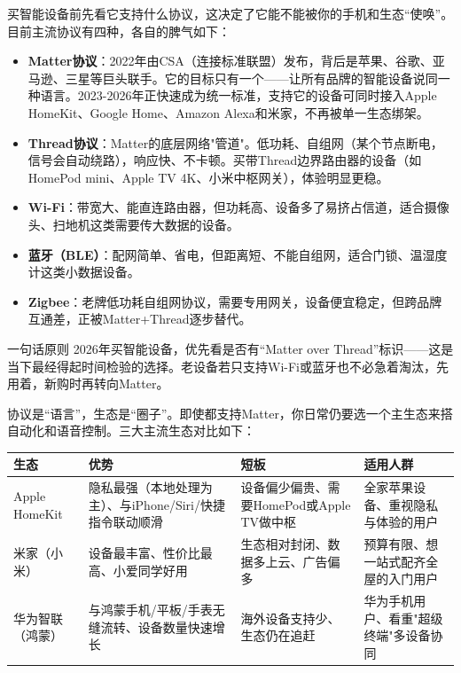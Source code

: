 


买智能设备前先看它支持什么协议，这决定了它能不能被你的手机和生态“使唤”。目前主流协议有四种，各自的脾气如下：

\begin{itemize}
  \item \textbf{Matter协议}：2022年由CSA（连接标准联盟）发布，背后是苹果、谷歌、亚马逊、三星等巨头联手。它的目标只有一个——让所有品牌的智能设备说同一种语言。2023-2026年正快速成为统一标准，支持它的设备可同时接入Apple HomeKit、Google Home、Amazon Alexa和米家，不再被单一生态绑架。
  \item \textbf{Thread协议}：Matter的底层网络"管道"。低功耗、自组网（某个节点断电，信号会自动绕路），响应快、不卡顿。买带Thread边界路由器的设备（如HomePod mini、Apple TV 4K、小米中枢网关），体验明显更稳。
  \item \textbf{Wi-Fi}：带宽大、能直连路由器，但功耗高、设备多了易挤占信道，适合摄像头、扫地机这类需要传大数据的设备。
  \item \textbf{蓝牙（BLE）}：配网简单、省电，但距离短、不能自组网，适合门锁、温湿度计这类小数据设备。
  \item \textbf{Zigbee}：老牌低功耗自组网协议，需要专用网关，设备便宜稳定，但跨品牌互通差，正被Matter+Thread逐步替代。
\end{itemize}

\begin{tcbinfo}{一句话原则}
2026年买智能设备，优先看是否有“Matter over Thread”标识——这是当下最经得起时间检验的选择。老设备若只支持Wi-Fi或蓝牙也不必急着淘汰，先用着，新购时再转向Matter。

\end{tcbinfo}


协议是“语言”，生态是“圈子”。即使都支持Matter，你日常仍要选一个主生态来搭自动化和语音控制。三大主流生态对比如下：

\begin{center}
\begin{tabularx}{\linewidth}{|X|X|X|X|}
\hline
\textbf{生态} & \textbf{优势} & \textbf{短板} & \textbf{适用人群} \tabularnewline
\hline
Apple HomeKit & 隐私最强（本地处理为主）、与iPhone/Siri/快捷指令联动顺滑 & 设备偏少偏贵、需要HomePod或Apple TV做中枢 & 全家苹果设备、重视隐私与体验的用户 \tabularnewline
米家（小米） & 设备最丰富、性价比最高、小爱同学好用 & 生态相对封闭、数据多上云、广告偏多 & 预算有限、想一站式配齐全屋的入门用户 \tabularnewline
华为智联（鸿蒙） & 与鸿蒙手机/平板/手表无缝流转、设备数量快速增长 & 海外设备支持少、生态仍在追赶 & 华为手机用户、看重"超级终端"多设备协同 \tabularnewline
\hline
\end{tabularx}
\end{center}

